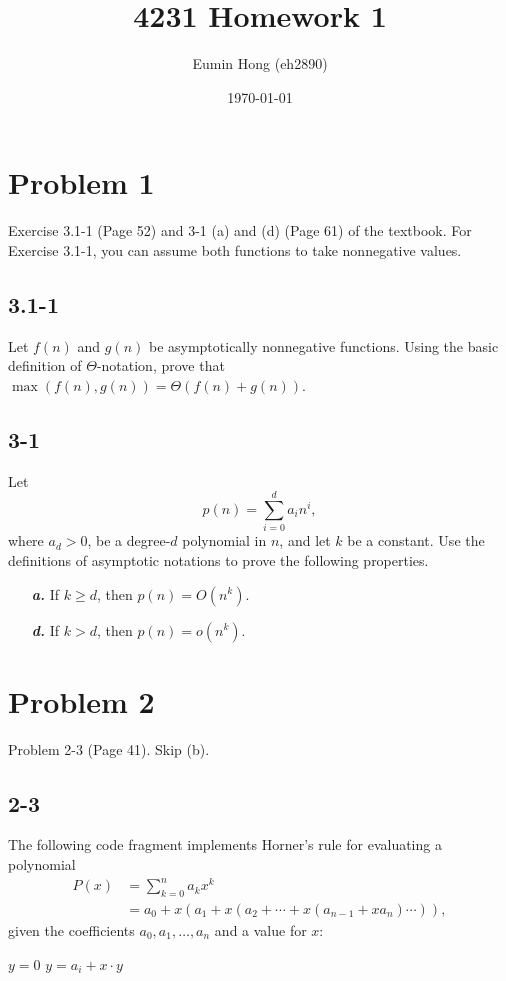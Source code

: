 \documentclass{../../class}
\title{4231 Homework 1}
\author{Eumin Hong (eh2890)}
\date{\today}
\begin{document}
\maketitle



\section*{Problem 1}
\begin{tcolorbox}
    Exercise 3.1-1 (Page 52) and 3-1 (a) and (d) (Page 61) of the textbook. For Exercise 3.1-1, you can assume both functions to take nonnegative values.
\end{tcolorbox}

\subsection*{3.1-1}
Let $f(n)$ and $g(n)$ be asymptotically nonnegative functions. Using the basic definition of $\Theta $-notation, prove that $\max{ \left(f(n), g(n)\right)} = \Theta \left(f(n) + g(n)\right)$.

\subsection*{3-1}
Let
$$p(n) = \sum_{i=0}^{d} a_in^i,$$
where $a_d > 0$, be a degree-$d$ polynomial in $n$, and let $k$ be a constant. Use the definitions of asymptotic notations to prove the following properties.
\begin{itemize}
    \item[\textbf{\textit{a.}}] If $k \geq d$, then $p(n) = O\left(n^k\right)$.
    \item[\textbf{\textit{d.}}] If $k > d$, then $p(n) = o\left(n^k\right)$.
\end{itemize}

\newpage
\section*{Problem 2}
\begin{tcolorbox}
    Problem 2-3 (Page 41). Skip (b).
\end{tcolorbox}

\subsection*{2-3}
The following code fragment implements Horner’s rule for evaluating a polynomial
\begin{align*}
    P(x) &= \sum_{k=0}^{n} a_kx^k\\
    &= a_0 + x(a_1 + x(a_2 + \cdots + x(a_{n-1} + xa_n) \cdots )),
\end{align*}
given the coefficients $a_0, a_1, \dots, a_n$ and a value for $x$:
\begin{algorithmic}[1]
\State $y = 0$
    \State $y = a_i + x\cdot y$
\ENDFOR
\end{algorithmic}
\end{document}
